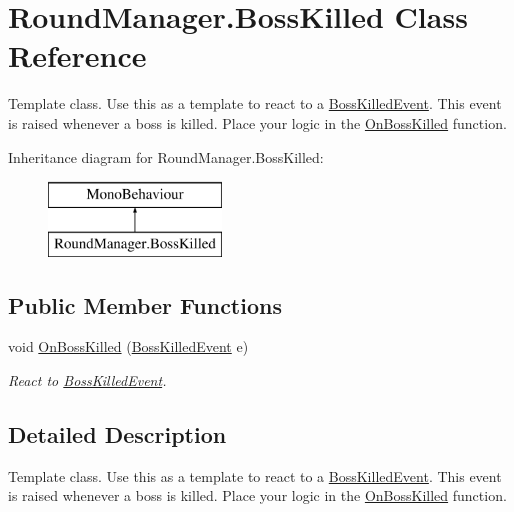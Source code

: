 \hypertarget{class_round_manager_1_1_boss_killed}{}\section{Round\+Manager.\+Boss\+Killed Class Reference}
\label{class_round_manager_1_1_boss_killed}


Template class. Use this as a template to react to a \hyperlink{class_round_manager_1_1_events_1_1_boss_killed_event}{Boss\+Killed\+Event}. This event is raised whenever a boss is killed. Place your logic in the \hyperlink{class_round_manager_1_1_boss_killed_a6b8d67c8093c04bada8d2cf68854247c}{On\+Boss\+Killed} function.  


Inheritance diagram for Round\+Manager.\+Boss\+Killed\+:\begin{figure}[H]
\begin{center}
\leavevmode
\includegraphics[height=2.000000cm]{class_round_manager_1_1_boss_killed}
\end{center}
\end{figure}
\subsection*{Public Member Functions}
\begin{DoxyCompactItemize}
\item 
void \hyperlink{class_round_manager_1_1_boss_killed_a6b8d67c8093c04bada8d2cf68854247c}{On\+Boss\+Killed} (\hyperlink{class_round_manager_1_1_events_1_1_boss_killed_event}{Boss\+Killed\+Event} e)
\begin{DoxyCompactList}\small\item\em React to \hyperlink{class_round_manager_1_1_events_1_1_boss_killed_event}{Boss\+Killed\+Event}. \end{DoxyCompactList}\end{DoxyCompactItemize}


\subsection{Detailed Description}
Template class. Use this as a template to react to a \hyperlink{class_round_manager_1_1_events_1_1_boss_killed_event}{Boss\+Killed\+Event}. This event is raised whenever a boss is killed. Place your logic in the \hyperlink{class_round_manager_1_1_boss_killed_a6b8d67c8093c04bada8d2cf68854247c}{On\+Boss\+Killed} function. 




